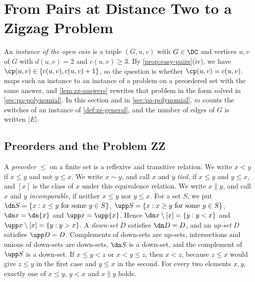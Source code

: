 
\section{From Pairs at Distance Two to a Zigzag Problem}
\label{sec:zz-zigzag}

An \emph{instance of the open case} is a triple $(G, u, v)$ with $G \in \DC$ and vertices $u, v$ of $G$ with $d(u, v) = 2$ and $c(u, v) \geq 3$.
By \cref{prop:easy-pairs}(iv), we have $\cp(u, v) \in \{c(u, v), c(u, v) + 1\}$, so the question is whether $\cp(u, v) = c(u, v)$.
 maps such an instance to an instance of a problem on a preordered set with the same answer, and \cref{lem:zz-answers} rewrites that problem in the form solved in \cref{sec:pa-polynomial}.
In this section and in \cref{sec:pa-polynomial}, $m$ counts the switches of an instance of \cref{def:zz-general}, and the number of edges of $G$ is written $|E|$.

\subsection{Preorders and the Problem ZZ}
\label{sec:zz-preorders}

\begin{definition}[Preorders]
\label{def:zz-preorder}
A \emph{preorder} $\leq$ on a finite set is a reflexive and transitive relation.
We write $x < y$ if $x \leq y$ and not $y \leq x$.
We write $x \sim y$, and call $x$ and $y$ \emph{tied}, if $x \leq y$ and $y \leq x$, and $[x]$ is the class of $x$ under this equivalence relation.
We write $x \parallel y$, and call $x$ and $y$ \emph{incomparable}, if neither $x \leq y$ nor $y \leq x$.
For a set $S$, we put $\dn S = \{x : x \leq y \text{ for some } y \in S\}$, $\upp S = \{x : x \geq y \text{ for some } y \in S\}$, $\dn x = \dn \{x\}$ and $\upp x = \upp \{x\}$.
Hence $\dn x \setminus [x] = \{y : y < x\}$ and $\upp x \setminus [x] = \{y : y > x\}$.
A \emph{down-set} $D$ satisfies $\dn D = D$, and an \emph{up-set} $D$ satisfies $\upp D = D$.
Complements of down-sets are up-sets, intersections and unions of down-sets are down-sets, $\dn S$ is a down-set, and the complement of $\upp S$ is a down-set.
If $x \leq y < z$ or $x < y \leq z$, then $x < z$, because $z \leq x$ would give $z \leq y$ in the first case and $y \leq x$ in the second.
For every two elements $x, y$, exactly one of $x \leq y$, $y < x$ and $x \parallel y$ holds.
\end{definition}

